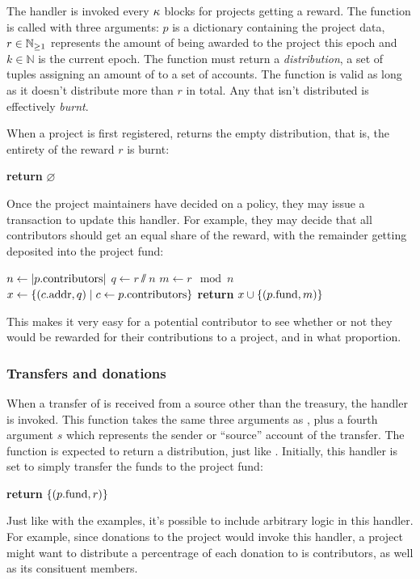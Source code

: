 The  handler is invoked every $\kappa$ blocks for
projects getting a reward. The function is called with three arguments: $p$ is
a dictionary containing the project data, $r \in \mathbb{N}_{\geq 1}$ represents the amount
of \oscoin{} being awarded to the project this epoch and $k \in \mathbb{N}$ is the
current epoch. The function must return a \emph{distribution}, a set of tuples
assigning an amount of \oscoin{} to a set of accounts. The function is valid
as long as it doesn't distribute more than $r$ \oscoin{} in total. Any \oscoin{}
that isn't distributed is effectively \emph{burnt}.

When a project is first registered,  returns the empty
distribution, that is, the entirety of the reward $r$ is burnt:
\begin{algorithmic}[0]
        \State \textbf{return} $\varnothing$
    \EndProcedure
\end{algorithmic}

\noindent Once the project maintainers have decided on a policy, they may issue a
transaction to update this handler. For example, they may decide that all
contributors should get an equal share of the reward, with the remainder
getting deposited into the project fund:

\begin{algorithmic}[0]
        \State $n \gets |p.{\mathrm{contributors}}|$
        \State $q \gets r \sslash n$
        \State $m \gets r \mod n$
        \State $x \gets \{ (c.{\mathrm{addr}}, q) \mid c \gets p.{\mathrm{contributors}} \}$
        \State \textbf{return} $x \cup \{ (p.{\mathrm{fund}}, m) \}$
    \EndProcedure
\end{algorithmic}
This makes it very easy for a potential contributor to see whether or not they
would be rewarded for their contributions to a project, and in what proportion.

\subsubsection{Transfers and donations}

When a transfer of \oscoin{} is received from a source other than the treasury,
the  handler is invoked. This function takes the same
three arguments as , plus a fourth argument $s$ which
represents the sender or ``source'' account of the transfer. The function is
expected to return a distribution, just like . Initially,
this handler is set to simply transfer the funds to the project fund:
\medskip
\begin{algorithmic}[0]
        \State \textbf{return} $\{ (p.{\mathrm{fund}}, r) \}$
    \EndProcedure
\end{algorithmic}
Just like with the  examples, it's possible to include
arbitrary logic in this handler. For example, since donations to the project
would invoke this handler, a project might want to distribute a percentrage
of each donation to is contributors, as well as its consituent members.

